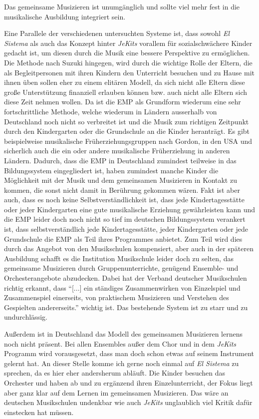 
Das gemeinsame Musizieren ist
unumgänglich und sollte viel mehr fest in die musikalische Ausbildung integriert
sein.

Eine Parallele der verschiedenen untersuchten Systeme ist, dass sowohl \emph{El
Sistema} als auch das Konzept hinter \emph{JeKits} vorallem für sozialschwächere
Kinder gedacht ist, um diesen durch die Musik eine bessere Perspektive zu
ermöglichen. Die Methode nach Suzuki hingegen, wird durch die wichtige Rolle der
Eltern, die als Begleitpersonen mit ihren Kindern den Unterricht besuchen und zu
Hause mit ihnen üben sollen eher zu einem elitären Modell, da sich nicht alle
Eltern diese große Unterstützung finanziell erlauben können bzw. auch nicht alle
Eltern sich diese Zeit nehmen wollen. Da ist die EMP als Grundform wiederum eine
sehr fortschrittliche Methode, welche wiederum in Ländern ausserhalb von
Deutschland noch nicht so verbreitet ist und die Musik zum richtigen Zeitpunkt
durch den Kindergarten oder die Grundschule an die Kinder heranträgt. Es gibt
beispielweise musikalische Früherziehungsgruppen nach Gordon, in den USA und
sicherlich auch die ein oder andere musikalische Früherziehung in anderen
Ländern. Dadurch, dass die EMP in Deutschland zumindest teilweise in das
Bildungssystem eingegliedert ist, haben zumindest manche Kinder die Möglichkeit
mit der Musik und dem gemeinsamen Musizieren in Kontakt zu kommen, die sonst
nicht damit in Berührung gekommen wären. Fakt ist aber auch, dass es noch keine
Selbstverständlichkeit ist, dass jede Kindertagesstätte oder jeder Kindergarten
eine gute musikalische Erziehung gewährleisten kann und die EMP leider doch noch
nicht so tief im deutschen Bildungssystem verankert ist, dass selbstverständlich
jede Kindertagesstätte, jeder Kindergarten oder jede Grundschule die EMP als
Teil ihres Programmes anbietet. Zum Teil wird dies durch das Angebot von den
Musikschulen kompensiert, aber auch in der späteren Ausbildung schafft es die
Institution Musikschule leider doch zu selten, das gemeinsame Musizieren durch
Gruppenunterrichte, genügend Ensemble- und Orchesterangebote abzudecken. Dabei
hat der Verband deutscher Musikschulen richtig erkannt, dass \enquote{[...] ein
ständiges Zusammenwirken von Einzelspiel und Zusammenspiel einerseits, von
praktischem Musizieren und Verstehen des Gespielten andererseits.} wichtig ist.
\autocite[22]{losert:die_kunst_zu_unterrichten} Das bestehende System ist zu
starr und zu undurchlässig.

Außerdem ist in Deutschland das Modell des gemeinsamen Musizieren lernens noch nicht präsent. 
Bei allen Ensembles außer dem Chor und in
dem \emph{JeKits} Programm wird vorausgesetzt, dass man doch schon etwas auf seinem
Instrument gelernt hat. An dieser Stelle komme ich gerne noch einmal auf \emph{El
Sistema} zu sprechen, da es hier eher andersherum abläuft. Die Kinder besuchen
das Orchester und haben ab und zu ergänzend ihren Einzelunterricht, der Fokus
liegt aber ganz klar auf dem Lernen im gemeinsamen Musizieren. Das wäre an
deutschen Musikschulen undenkbar wie auch \emph{JeKits} unglaublich viel Kritik dafür
einstecken hat müssen.

